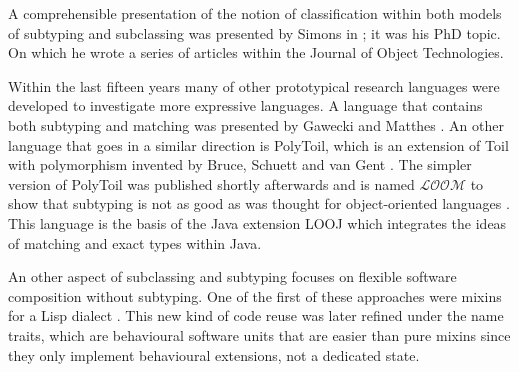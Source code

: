 A comprehensible presentation of the notion of classification within
both models of subtyping and subclassing was presented by Simons in
\cite{simons_theory_2002-2}; it was his PhD topic. On which he wrote a series of
articles within the Journal of Object Technologies.

Within the last fifteen years many of other prototypical research
languages were developed to investigate more expressive languages. A
language that contains both subtyping and matching was presented
by Gawecki and Matthes \cite{gawecki_tool:_1995}. An other language
that goes in a similar direction is PolyToil, which is an extension
of Toil with polymorphism invented by Bruce, Schuett and van Gent
\cite{bruce_polytoil:_1995}. The simpler version of PolyToil was
published shortly afterwards and is named $\mathcal{LOOM}$ to show
that subtyping is not as good as was thought for object-oriented languages
\cite{bruce_subtyping_1997}. This language is the basis of the Java
extension LOOJ which integrates the ideas of matching and exact types
within Java.

An other aspect of subclassing and subtyping focuses
on flexible software composition without subtyping. One
of the first of these approaches were mixins for a Lisp dialect
\cite{bracha_mixin-based_1990}. This new kind of code reuse
was later refined under the name traits, which are behavioural software
units \cite{schaerli_traits:_2003,ducasse_traits:_2006} that are easier
than pure mixins since they only implement behavioural extensions,
not a dedicated state.

